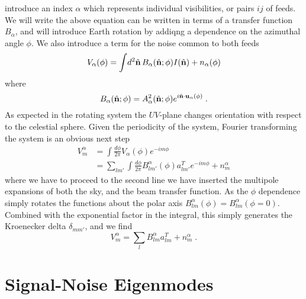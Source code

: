\documentclass{revtex4}
\begin{document}
introduce an index $\alpha$ which represents individual visibilities, or pairs
$ij$ of feeds. We will write the above equation can be written in terms of a
transfer function $B_\alpha$, and will introduce Earth rotation by addiqng a
dependence on the azimuthal angle $\phi$. We also introduce a term for the noise
common to both feeds
\begin{equation}
  V_\alpha(\phi) = \int \! d^2\hat{\mathbf{n}}\, B_\alpha(\hat{\mathbf{n}}; \phi) I(\hat{\mathbf{n}})
  + n_\alpha(\phi)
\end{equation}
where
\begin{equation}
  B_\alpha(\hat{\mathbf{n}}; \phi) = A_\alpha^2(\hat{\mathbf{n}}; \phi) e^{i \hat{\mathbf{n}} \cdot
    \mathbf{u}_{\alpha}(\phi)} \; .
\end{equation}
As expected in the rotating system the $UV$-plane changes orientation with
respect to the celestial sphere. Given the periodicity of the system, Fourier
transforming the system is an obvious next step
\begin{align}
  V^\alpha_m &= \int \frac{d\phi}{2\pi} V_\alpha(\phi) e^{-i m \phi} \\
  & = \sum_{l m'}\int \frac{d\phi}{2\pi} B^\alpha_{l m'}(\phi) a^T_{l m'} e^{-i
    m \phi}+ n^\alpha_m
\end{align}
where we have to proceed to the second line we have inserted the multipole
expansions of both the sky, and the beam transfer function. As the $\phi$
dependence simply rotates the functions about the polar axis
$B^\alpha_{lm}(\phi) = B^{\alpha}_{lm}(\phi=0)$. Combined with the exponential
factor in the integral, this simply generates the Kroenecker delta
$\delta_{mm'}$, and we find
\begin{equation}
V^\alpha_m = \sum_{l} B^\alpha_{l m} a^T_{l m}+ n^\alpha_m \; .
\end{equation}

\section{Signal-Noise Eigenmodes}

\end{document}
